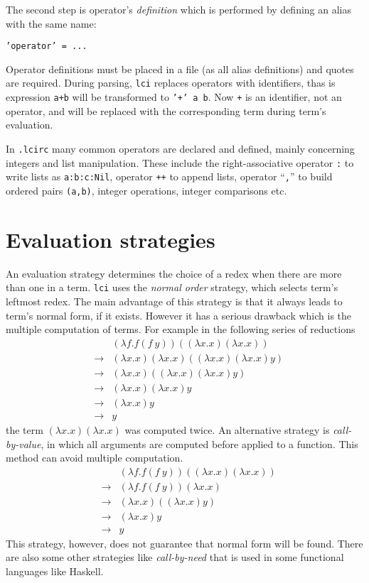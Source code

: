\documentclass[a4paper,11pt]{article}
\newcommand{\lci}{\texttt{lci}}
\newcommand{\qm}[1]{``#1''}
\newcommand{\kwd}[1]{\texttt{#1}}
\begin{document}
The second step is operator's \emph{definition} which is performed by defining an
alias with the same name:
\begin{center}
	\kwd{'operator' = ...}
\end{center}
Operator definitions must be placed in a file (as all alias definitions) and quotes
are required. During parsing, \lci{} replaces operators with identifiers, thas is
expression \kwd{a+b} will be transformed to \kwd{'+' a b}. Now \kwd{+} is an
identifier, not an operator, and will be replaced with the corresponding term
during term's evaluation.

In \kwd{.lcirc} many common operators are declared and defined, mainly concerning
integers and list manipulation. These include the right-associative
operator \kwd{:} to write lists as \kwd{a:b:c:Nil}, operator \kwd{++} to append
lists, operator \qm{\kwd{,}} to build ordered pairs \kwd{(a,b)}, integer operations,
integer comparisons etc.

\section{Evaluation strategies}
An evaluation strategy determines the choice of a redex when there are more than
one in a term. \lci{} uses the \emph{normal order} strategy, which selects term's
leftmost redex. The main advantage of this strategy is that it always leads to
term's normal form, if it exists. However it has a serious drawback which is the
multiple computation of terms. For example in the following series of reductions
\begin{eqnarray*}
	&& (\lambda f.f(f\ y))((\lambda x.x)(\lambda x.x)) \\
	& \rightarrow & (\lambda x.x)(\lambda x.x)((\lambda x.x)(\lambda x.x)y) \\
	& \rightarrow & (\lambda x.x)((\lambda x.x)(\lambda x.x)y) \\
	& \rightarrow & (\lambda x.x)(\lambda x.x)y \\
	& \rightarrow & (\lambda x.x)y \\
	& \rightarrow & y
\end{eqnarray*}
the term $(\lambda x.x)(\lambda x.x)$ was computed twice. An alternative strategy
is \emph{call-by-value}, in which all arguments are computed before applied to a function.
This method can avoid multiple computation.
\begin{eqnarray*}
	&& (\lambda f.f(f\ y))((\lambda x.x)(\lambda x.x)) \\
	& \rightarrow & (\lambda f.f(f\ y))(\lambda x.x) \\
	& \rightarrow & (\lambda x.x)((\lambda x.x)y) \\
	& \rightarrow & (\lambda x.x)y \\
	& \rightarrow & y
\end{eqnarray*}
This strategy, however, does not guarantee that normal form will be found. There
are also some other strategies like \emph{call-by-need} that is used in some functional
languages like Haskell.
\end{document}
